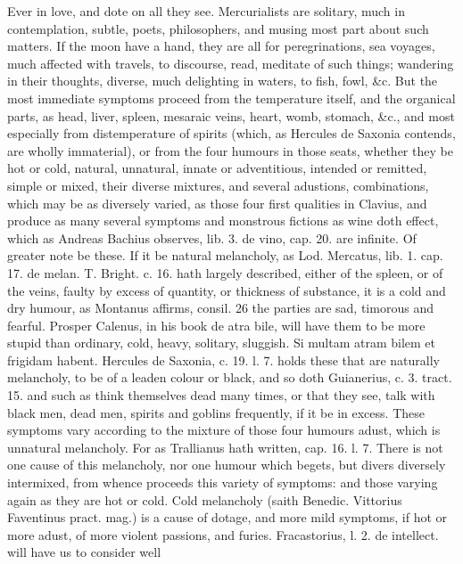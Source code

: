 {Ever in love, and dote on all they see. Mercurialists are solitary,
much in contemplation, subtle, poets, philosophers, and musing most
part about such matters. If the moon have a hand, they are all for
peregrinations, sea voyages, much affected with travels, to discourse,
read, meditate of such things; wandering in their thoughts, diverse,
much delighting in waters, to fish, fowl, \&c.
But the most immediate symptoms proceed from the temperature itself,
and the organical parts, as head, liver, spleen, mesaraic veins, heart,
womb, stomach, \&c., and most especially from distemperature of spirits
(which, as Hercules de Saxonia contends, are wholly immaterial),
or from the four humours in those seats, whether they be hot or cold,
natural, unnatural, innate or adventitious, intended or remitted,
simple or mixed, their diverse mixtures, and several adustions,
combinations, which may be as diversely varied, as those four
first qualities in  Clavius, and produce as many several symptoms
and monstrous fictions as wine doth effect, which as Andreas Bachius
observes, lib. 3. de vino, cap. 20. are infinite. Of greater note be
these.
If it be natural melancholy, as Lod. Mercatus, lib. 1. cap. 17. de
melan. T. Bright. c. 16. hath largely described, either of the spleen,
or of the veins, faulty by excess of quantity, or thickness of
substance, it is a cold and dry humour, as Montanus affirms, consil. 26
the parties are sad, timorous and fearful. Prosper Calenus, in his book
de atra bile, will have them to be more stupid than ordinary, cold,
heavy, solitary, sluggish. Si multam atram bilem et frigidam habent.
Hercules de Saxonia, c. 19. l. 7. holds these that are naturally
melancholy, to be of a leaden colour or black, and so doth Guianerius,
c. 3. tract. 15. and such as think themselves dead many times, or that
they see, talk with black men, dead men, spirits and goblins
frequently, if it be in excess. These symptoms vary according to the
mixture of those four humours adust, which is unnatural melancholy. For
as Trallianus hath written, cap. 16. l. 7. There is not one cause
of this melancholy, nor one humour which begets, but divers diversely
intermixed, from whence proceeds this variety of symptoms: and those
varying again as they are hot or cold. Cold melancholy (saith
Benedic. Vittorius Faventinus pract. mag.) is a cause of dotage, and
more mild symptoms, if hot or more adust, of more violent passions, and
furies. Fracastorius, l. 2. de intellect. will have us to consider well
}
